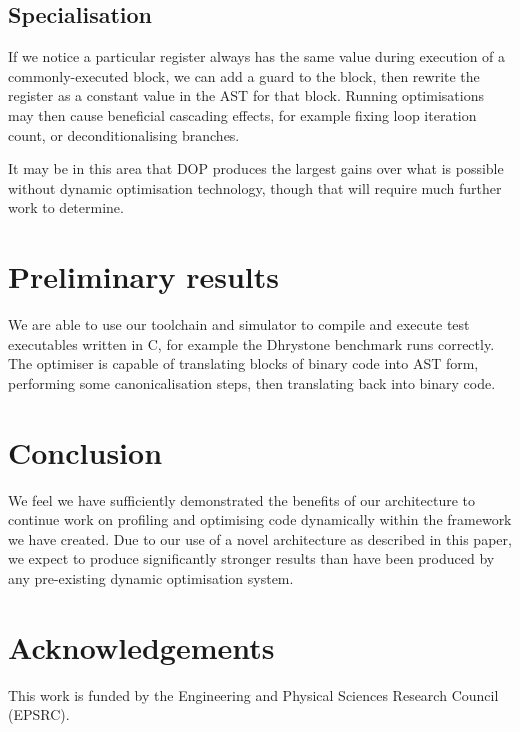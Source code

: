 \documentclass[11pt,letterpaper,twocolumn,notitlepage]{article}
\begin{document}
\subsection{Specialisation}

If we notice a particular register always has the same value during execution of a commonly-executed block, we can add a guard to the block, then rewrite the register as a constant value in the AST for that block. Running optimisations may then cause beneficial cascading effects, for example fixing loop iteration count, or deconditionalising branches.

It may be in this area that DOP produces the largest gains over what is possible without dynamic optimisation technology, though that will require much further work to determine.

\section{Preliminary results}

We are able to use our toolchain and simulator to compile and execute test executables written in C, for example the Dhrystone benchmark runs correctly. The optimiser is capable of translating blocks of binary code into AST form, performing some canonicalisation steps, then translating back into binary code.

\section{Conclusion}

We feel we have sufficiently demonstrated the benefits of our architecture to continue work on profiling and optimising code dynamically within the framework we have created. Due to our use of a novel architecture as described in this paper, we expect to produce significantly stronger results than have been produced by any pre-existing dynamic optimisation system.

\section{Acknowledgements}

This work is funded by the Engineering and Physical Sciences Research Council (EPSRC).




\end{document}
